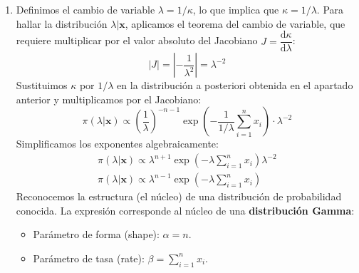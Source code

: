 \begin{enumerate}[label=\color{red}\textbf{\arabic*)}]
\begin{enumerate}[label=\color{red}\textbf{\alph*)}]
		            La verosimilitud conjunta de la muestra es: \[
			            f(\mathbf{x}|\kappa)=\prod_{i=1}^{n} \dfrac{1}{\kappa}\exp \left( -\dfrac{x_{i}}{\kappa} \right) =\kappa^{-n}\exp \left( -\dfrac{1}{\kappa}\sum_{i=1}^{n} x_{i} \right)
		            \]
		            Se nos da una distribución a priori no informativa: \[
			            \pi(\kappa)\propto \kappa^{-1}
		            \]
		            Aplicamos el Teorema de Bayes en su forma proporcional: \[
			            \pi(\kappa|\mathbf{x})\propto f(\mathbf{x}|\kappa)\pi(\kappa)
		            \]
		            Multiplicamos ambas expresiones: \[
			            \pi(\kappa|\mathbf{x})\propto \left[ \kappa^{-n} \exp \left( -\dfrac{1}{\kappa}\sum_{i=1}^{n} x_{i} \right)  \right] \kappa^{-1}
		            \]
		            Agrupando los términos de $\kappa$, obtenemos la expresión final solicita: \[
			            \pi(\kappa|\mathbf{x})\propto \kappa^{-n-1}\exp \left( -\dfrac{1}{\kappa}\sum_{i=1}^{n} x_{i} \right)
		            \]
		      \item {}

		            Definimos el cambio de variable $\lambda=1 /\kappa$, lo que implica que $\kappa=1 / \lambda$. Para hallar la distribución $\lambda|\mathbf{x}$, aplicamos el teorema del cambio de variable, que requiere multiplicar por el valor absoluto del Jacobiano $J=\dfrac{\mathrm{d}\kappa}{\mathrm{d}\lambda}$: \[
			            |J|=\left| -\dfrac{1}{\lambda^2} \right| =\lambda^{-2}
		            \]
		            Sustituimos $\kappa$ por $1 / \lambda$ en la distribución a posteriori obtenida en el apartado anterior y multiplicamos por el Jacobiano: \[
			            \pi(\lambda|\mathbf{x})\propto \left( \dfrac{1}{\lambda} \right) ^{-n-1}\exp \left( -\dfrac{1}{1 / \lambda}\sum_{i=1}^{n} x_{i} \right) \cdot \lambda^{-2}
		            \]
		            Simplificamos los exponentes algebraicamente: \[
			            \begin{array}{c}
				            \pi(\lambda|\mathbf{x})\propto \lambda^{n+1}\exp \left( -\lambda \sum_{i=1}^{n} x_{i} \right) \lambda^{-2} \\
				            \pi(\lambda|\mathbf{x})\propto \lambda^{n-1}\exp \left( -\lambda \sum_{i=1}^{n} x_{i} \right)
			            \end{array}
		            \]
		            Reconocemos la estructura (el núcleo) de una distribución de probabilidad conocida. La expresión corresponde al núcleo de una \textbf{distribución Gamma}:
		            \begin{itemize}[label=\textbullet]
			            \item Parámetro de forma (shape): $\alpha=n$.
			            \item Parámetro de tasa (rate): $\beta=\sum_{i=1}^{n} x_{i}$.
		            \end{itemize}


\end{enumerate}
\end{enumerate}
